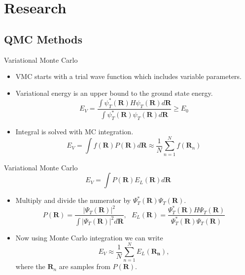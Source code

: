 \documentclass{beamer}
\newcommand{\R}{\mathbf{R}}
\begin{document}
\section{Research}
\subsection{QMC Methods}
\begin{frame}{Variational Monte Carlo}
\begin{itemize}
   \item VMC starts with a trial wave function which includes variable parameters.
   \item Variational energy is an upper bound to the ground state energy.
   \begin{equation*}
      E_V = \frac{\int\psi_T^*(\R)H\psi_T(\R)d\R}{\int\psi_T^*(\R)\psi_T(\R)d\R} \ge E_0
   \end{equation*}
   \item Integral is solved with MC integration.
   \begin{equation*}
      E_V = \int f(\R)P(\R) d\R \approx \frac{1}{N}\sum\limits_{n=1}^N f(\R_n)
   \end{equation*}
\end{itemize}
\end{frame}

\begin{frame}{Variational Monte Carlo}
   \begin{equation*}
      E_V = \int P(\R)E_L(\R) d\R
   \end{equation*}
\begin{itemize}
   \item Multiply and divide the numerator by $\Psi_T^*(\R)\Psi_T(\R)$.
   \begin{equation*}
      P(\R) = \frac{|\Psi_T(\R)|^2}{\int|\Psi_T(\R)|^2d\R}, ~~~
      E_L(\R) = \frac{\Psi_T^*(\R) H \Psi_T(\R)}{\Psi_T^*(\R) \Psi_T(\R)}
   \end{equation*}
   \item Now using Monte Carlo integration we can write
   \begin{equation*}
      E_V \approx \frac{1}{N} \sum\limits_{n=1}^N E_L(\mathbf{R_n}),
   \end{equation*}
   where the $\R_n$ are samples from $P(\R)$.
\end{itemize}
\end{frame}
\end{document}

